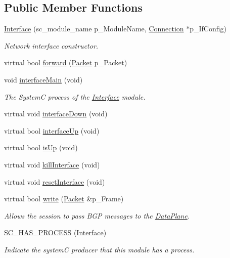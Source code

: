 \subsection*{Public Member Functions}
\begin{DoxyCompactItemize}
\item 
\hypertarget{classInterface_a258ac26b1adb34b35eb5bd5fa7a6561c}{\hyperlink{classInterface_a258ac26b1adb34b35eb5bd5fa7a6561c}{Interface} (sc\-\_\-module\-\_\-name p\-\_\-\-Module\-Name, \hyperlink{classConnection}{Connection} $\ast$p\-\_\-\-If\-Config)}\label{classInterface_a258ac26b1adb34b35eb5bd5fa7a6561c}

\begin{DoxyCompactList}\small\item\em Network interface constructor. \end{DoxyCompactList}\item 
virtual bool \hyperlink{classInterface_aea72dc6085e96d5a69d770277738802b}{forward} (\hyperlink{classPacket}{Packet} p\-\_\-\-Packet)
\item 
\hypertarget{classInterface_ad0382d42ebfe88d2c947744a6fe139c8}{void \hyperlink{classInterface_ad0382d42ebfe88d2c947744a6fe139c8}{interface\-Main} (void)}\label{classInterface_ad0382d42ebfe88d2c947744a6fe139c8}

\begin{DoxyCompactList}\small\item\em The System\-C process of the \hyperlink{classInterface}{Interface} module. \end{DoxyCompactList}\item 
virtual void \hyperlink{classInterface_a5398e14244e698b28c060429fa5ea433}{interface\-Down} (void)
\item 
virtual bool \hyperlink{classInterface_a28a060b50df99dacb3268b4a16d980e3}{interface\-Up} (void)
\item 
virtual bool \hyperlink{classInterface_a99298b5fd1fbec6d8da500a356921652}{is\-Up} (void)
\item 
virtual void \hyperlink{classInterface_ada8771473963bc48e4ae54263a109a25}{kill\-Interface} (void)
\item 
virtual void \hyperlink{classInterface_a788362ad5da987a5113f0cf02428bd89}{reset\-Interface} (void)
\item 
virtual bool \hyperlink{classInterface_a38e700c787ec1927f1dfcbecf6d5e67e}{write} (\hyperlink{classPacket}{Packet} \&p\-\_\-\-Frame)
\begin{DoxyCompactList}\small\item\em Allows the session to pass B\-G\-P messages to the \hyperlink{classDataPlane}{Data\-Plane}. \end{DoxyCompactList}\item 
\hyperlink{classInterface_a28ace3f1bba508032ddaf36c3c304b62}{S\-C\-\_\-\-H\-A\-S\-\_\-\-P\-R\-O\-C\-E\-S\-S} (\hyperlink{classInterface}{Interface})
\begin{DoxyCompactList}\small\item\em Indicate the system\-C producer that this module has a process. \end{DoxyCompactList}\end{DoxyCompactItemize}

